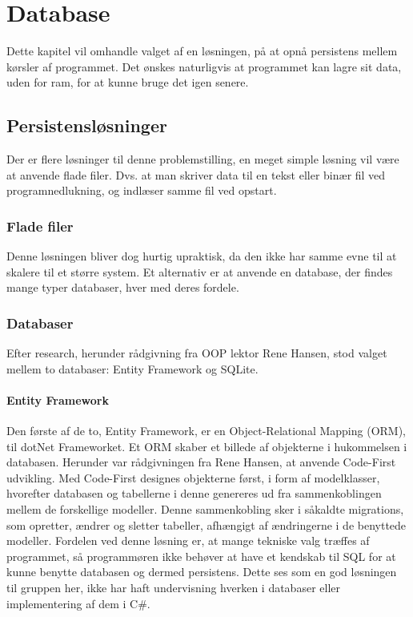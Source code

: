 \chapter{Database}\label{chap:database}

Dette kapitel vil omhandle valget af en løsningen, på at opnå persistens mellem kørsler af programmet.
Det ønskes naturligvis at programmet kan lagre sit data, uden for ram, for at kunne bruge det igen senere.

\section{Persistensløsninger}

Der er flere løsninger til denne problemstilling, en meget simple løsning vil være at anvende flade filer. 
Dvs. at man skriver data til en tekst eller binær fil ved programnedlukning, og indlæser samme fil ved opstart.

\subsection{Flade filer}
Denne løsningen bliver dog hurtig upraktisk, da den ikke har samme evne til at skalere til et større system.
Et alternativ er at anvende en database, der findes mange typer databaser, hver med deres fordele.

\subsection{Databaser}
Efter research, herunder rådgivning fra OOP lektor Rene Hansen, stod valget mellem to databaser: Entity Framework og SQLite.

\subsubsection*{Entity Framework}
Den første af de to, Entity Framework, er en Object-Relational Mapping (ORM), til dotNet Frameworket.
Et ORM skaber et billede af objekterne i hukommelsen i databasen. 
Herunder var rådgivningen fra Rene Hansen, at anvende Code-First udvikling.
Med Code-First designes objekterne først, i form af modelklasser, hvorefter databasen og tabellerne i denne genereres ud fra sammenkoblingen mellem de forskellige modeller. Denne sammenkobling sker i såkaldte migrations, som opretter, ændrer og sletter tabeller, afhængigt af ændringerne i de benyttede modeller.
Fordelen ved denne løsning er, at mange tekniske valg træffes af programmet, så programmøren ikke behøver at have et kendskab til \ac{SQL} for at kunne benytte databasen og dermed persistens.
Dette ses som en god løsningen til gruppen her, ikke har haft undervisning hverken i databaser eller implementering af dem i C\#.

